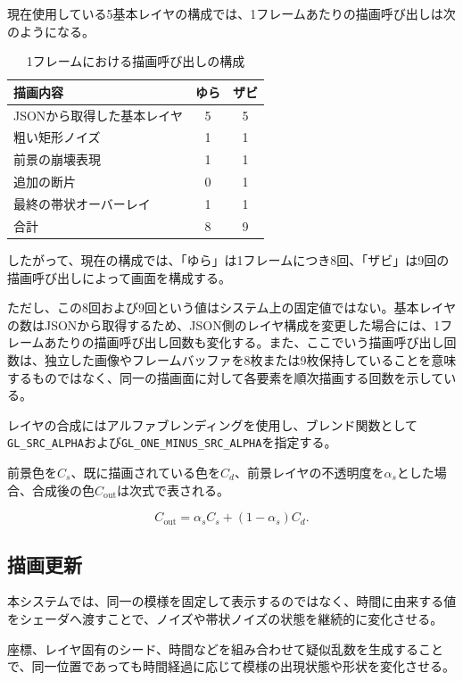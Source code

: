 現在使用している5基本レイヤの構成では、1フレームあたりの描画呼び出しは次のようになる。

\begin{table}[H]
\centering
\caption{1フレームにおける描画呼び出しの構成}
\begin{tabular}{lcc}
\toprule
描画内容 & ゆら & ザビ \\
\midrule
JSONから取得した基本レイヤ & 5 & 5 \\
粗い矩形ノイズ & 1 & 1 \\
前景の崩壊表現 & 1 & 1 \\
追加の断片 & 0 & 1 \\
最終の帯状オーバーレイ & 1 & 1 \\
\midrule
合計 & 8 & 9 \\
\bottomrule
\end{tabular}
\end{table}

したがって、現在の構成では、「ゆら」は1フレームにつき8回、「ザビ」は9回の描画呼び出しによって画面を構成する。

ただし、この8回および9回という値はシステム上の固定値ではない。基本レイヤの数はJSONから取得するため、JSON側のレイヤ構成を変更した場合には、1フレームあたりの描画呼び出し回数も変化する。また、ここでいう描画呼び出し回数は、独立した画像やフレームバッファを8枚または9枚保持していることを意味するものではなく、同一の描画面に対して各要素を順次描画する回数を示している。

レイヤの合成にはアルファブレンディングを使用し、ブレンド関数として\texttt{GL\_SRC\_ALPHA}および\texttt{GL\_ONE\_MINUS\_SRC\_ALPHA}を指定する。

前景色を\(C_s\)、既に描画されている色を\(C_d\)、前景レイヤの不透明度を\(\alpha_s\)とした場合、合成後の色\(C_{\mathrm{out}}\)は次式で表される。

\begin{equation}
C_{\mathrm{out}}=
\alpha_s C_s+
(1-\alpha_s)C_d.
\end{equation}


\subsection{描画更新}

本システムでは、同一の模様を固定して表示するのではなく、時間に由来する値をシェーダへ渡すことで、ノイズや帯状ノイズの状態を継続的に変化させる。

座標、レイヤ固有のシード、時間などを組み合わせて疑似乱数を生成することで、同一位置であっても時間経過に応じて模様の出現状態や形状を変化させる。

